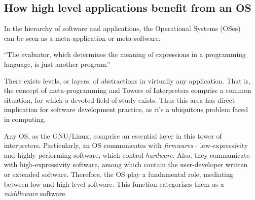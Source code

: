 \documentclass[
12pt,				%
openright,			%
oneside,			%
a4paper,			%
brazil,				%
english,			%
]{abntex2}
\begin{document}
\subsection{How high level applications benefit from an OS}

In the hierarchy of software and applications, the Operational Systems (OSes) can be seen as a meta-application or meta-software. 

``The evaluator, which determines the meaning of expressions in a
programming language, is just another program.'' \cite{abelson1996structure}

There exists levels, or layers, of abstractions in virtually any
application. That is, the concept of meta-programming and Towers of
Interpreters comprise a common situation, for which a devoted field of
study exists. Thus this area has direct implication for software
development practice, as it's a ubiquitous problem faced in computing.

Any OS, as the GNU/Linux, comprise an essential layer in this tower of
interpreters. Particularly, an OS communicates with \textit{firmwares}
- low-expressivity and highly-performing software, which control
\textit{hardware}. Also, they communicate with high-expressivity
software, among which contain the user-developer written or extended
software. Therefore, the OS play a fundamental role, mediating between
low and high level software. This function categorizes them as a
\textit{middleware} software.     
\end{document}
